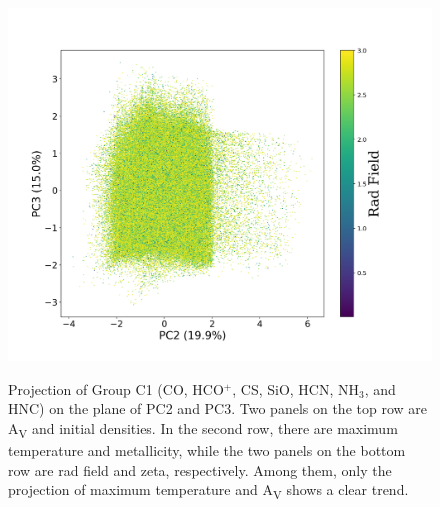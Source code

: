 \documentclass{aa}
\begin{document}
\begin{CJK*}{UTF8}{gbsn}
\begin{figure}[htbp]
{        \includegraphics[scale = 0.27]{7/PC2&3_radfield.png}
        }
        \caption{Projection of Group C1 (CO, HCO$^+$, CS, SiO, HCN, NH$_3$, and HNC) on the plane of PC2 and PC3. Two panels on the top row are A\textsubscript{V} and initial densities. In the second row, there are maximum temperature and metallicity, while the two panels on the bottom row are rad field and zeta, respectively. Among them, only the projection of maximum temperature and A\textsubscript{V} shows a clear trend.}
        \label{C1-23}
    \end{figure}
 

\end{CJK*}
\end{document}
